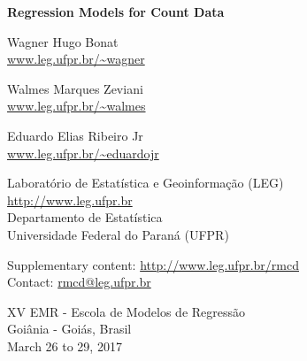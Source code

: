 \thispagestyle{empty}
\cleardoublepage
\thispagestyle{empty}


\begin{flushleft}
  \Large \bf
  Regression Models for Count Data
\end{flushleft}
\vspace*{1.5em}

\begin{flushleft}
Wagner Hugo Bonat\\
\url{www.leg.ufpr.br/~wagner}

Walmes Marques Zeviani\\
\url{www.leg.ufpr.br/~walmes}

Eduardo Elias Ribeiro Jr\\
\url{www.leg.ufpr.br/~eduardojr}
\end{flushleft}
\vspace*{2em}

Laboratório de Estatística e Geoinformação (LEG)\\
\url{http://www.leg.ufpr.br}\\
Departamento de Estatística\\
Universidade Federal do Paraná (UFPR)

Supplementary content: \url{http://www.leg.ufpr.br/rmcd}\\
Contact: \url{rmcd@leg.ufpr.br}
\vspace*{\fill}

\begin{center}
XV EMR - Escola de Modelos de Regressão\\
Goiânia - Goiás, Brasil\\
March 26 to 29, 2017
\end{center}

\clearpage
\thispagestyle{empty}
\pagebreak

\setcounter{page}{1}
